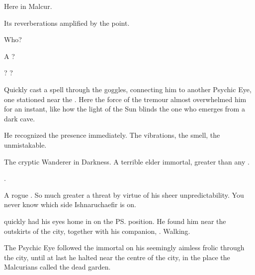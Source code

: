 \begin{garbage}
{Here in Malcur. 

Its reverberations amplified by the \nexus{} point.

Who? 

A \resphan? 

\Achsah? \Teshrial?} 

Quickly \Psyrex{} cast a spell through the goggles, connecting him to another Psychic Eye, one stationed near the \nexus. 
Here the force of the tremour almost overwhelmed him for an instant, like how the light of the Sun blinds the one who emerges from a dark cave. 

He recognized the presence immediately. 
The vibrations, the smell, the \colours unmistakable. 


The cryptic Wanderer in Darkness.
A terrible elder immortal, greater than any \resphan.

\QuessanthIshnaruchaefir.

A rogue \vertex. 
So much greater a threat by virtue of his sheer unpredictability. 
You never know which side Ishnaruchaefir is on. 



\Psyrex{} quickly had his eyes home in on the \ps{\vertex} position. 
He found him near the outskirts of the city, together with his companion, \Criseis. 
Walking. 


The Psychic Eye followed the immortal on his seemingly aimless frolic through the city, until at last he halted near the centre of the city, in the place the Malcurians called the dead garden. 


\end{garbage}
